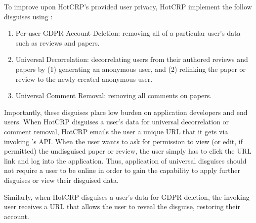 To improve upon HotCRP's provided user privacy, HotCRP implement the follow disguises using \sys:
\begin{enumerate}[nosep]
    \item Per-user GDPR Account Deletion: removing all of a particular user's data such as reviews and papers.
    \item Universal Decorrelation: decorrelating users from
        their authored reviews and papers by (1) generating an
        anonymous user, and (2) relinking the paper or review
        to the newly created anonymous user.
    \item Universal Comment Removal: removing all comments on papers.
\end{enumerate}
Importantly, these disguises place low burden on application developers and end users.
%
When HotCRP disguises a user's data for universal decorrelation or comment removal, HotCRP emails
the user a unique URL that it gets via invoking \sys's API.  When the user
wants to ask for permission to view (or edit, if permitted) the undisguised paper or review, the
user simply has to click the URL link and log into the application. Thus, application of universal
disguises should not require a user to be online in order to gain the capability to apply further
disguises or view their disguised data.

Similarly, when HotCRP disguises a user's data for GDPR deletion, the invoking user receives a URL
that allows the user to reveal the disguise, restoring their account.


